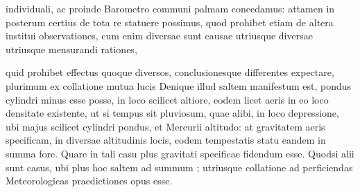  individuali, ac proinde Barometro\protect{}  communi  palmam concedamus: attamen   in posterum certius de tota re statuere possimus,  quod prohibet etiam de altera institui  observationes, cum enim diversae sunt  causae utriusque diversae utriusque mensurandi  rationes,\rule[-2cm]{0cm}{0.5cm} quid prohibet effectus quoque diversos,  conclusionesque differentes expectare, plurimum  ex collatione mutua lucis %
\pend 
\pstart  Denique
 illud saltem manifestum  est, pondus cylindri  minus esse posse, in loco scilicet  altiore, eodem licet aeris in eo  loco densitate existente, ut  si tempus sit pluviosum, quae  alibi, in loco depressione, ubi  majus scilicet cylindri pondus, et Mercurii\protect{} altitudo: at gravitatem\protect{} aeris\protect{} specificam, in diversae altitudinis  locis, eodem tempestatis statu eandem  in summa fore. Quare  in tali casu plus gravitati specificae\protect{}  fidendum esse. Quodsi alii sunt casus,  ubi plus  hoc saltem ad  summum ; utriusque collatione  ad perficiendas Meteorologicas praedictiones opus esse.  
 \pend 